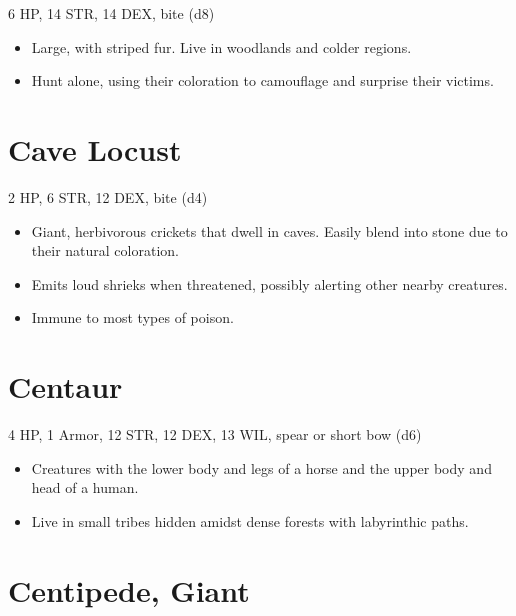 \documentclass[
  10pt,
  american,
]{article}
\begin{document}
6 HP, 14 STR, 14 DEX, bite (d8)

\begin{samepage}
\begin{itemize}
\setlength\itemsep{-.5em}
\item Large, with striped fur.   Live in woodlands and colder regions.
\item Hunt alone, using their coloration to camouflage and surprise their victims.
\end{itemize}
\end{samepage}

\hypertarget{cave-locust}{%
\section{Cave Locust}\label{cave-locust}}

2 HP, 6 STR, 12 DEX, bite (d4)

\begin{samepage}
\begin{itemize}
\setlength\itemsep{-.5em}
\item Giant, herbivorous crickets that dwell in caves.   Easily blend into stone due to their natural coloration.
\item Emits loud shrieks when threatened, possibly alerting other nearby creatures.
\item Immune to most types of poison.
\end{itemize}
\end{samepage}

\hypertarget{centaur}{%
\section{Centaur}\label{centaur}}

4 HP, 1 Armor, 12 STR, 12 DEX, 13 WIL, spear or short bow (d6)

\begin{samepage}
\begin{itemize}
\setlength\itemsep{-.5em}
\item Creatures with the lower body and legs of a horse and the upper body and head of a human.
\item Live in small tribes hidden amidst dense forests with labyrinthic paths.
\end{itemize}
\end{samepage}

\hypertarget{centipede-giant}{%
\section{Centipede, Giant}\label{centipede-giant}}
\end{document}
